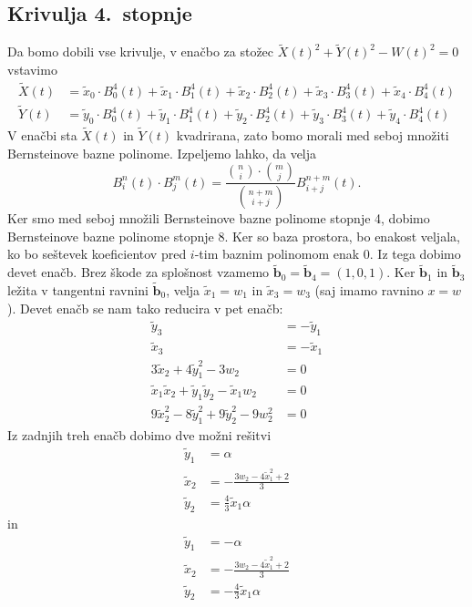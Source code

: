 \documentclass[a4paper,11pt]{article}
\theoremstyle{definition}
\theoremstyle{plain}
\begin{document}

\subsection{Krivulja 4.~stopnje}
Da bomo dobili vse krivulje, v enačbo za stožec $\tilde{X}(t)^2+\tilde{Y}(t)^2-W(t)^2=0$ vstavimo 
\begin{align*}
\tilde{X}(t) &= \tilde{x}_0\cdot B_0^4(t)+\tilde{x}_1\cdot B_1^4(t)+ \tilde{x}_2\cdot B_2^4(t) + \tilde{x}_3\cdot B_3^4(t) +\tilde{x}_4\cdot B_4^4(t)   \\
\tilde{Y}(t) &=\tilde{y}_0\cdot B_0^4(t)+\tilde{y}_1\cdot B_1^4(t)+\tilde{y}_2\cdot B_2^4(t) + \tilde{y}_3\cdot B_3^4(t) + \tilde{y}_4\cdot B_4^4(t)   
\end{align*}
V enačbi sta $\tilde{X}(t)$ in $\tilde{Y}(t)$ kvadrirana, zato bomo morali med seboj množiti Bernsteinove bazne polinome. Izpeljemo lahko, da velja
$$B_i^n(t)\cdot B_j^m(t)=\frac{\binom{n}{i} \cdot \binom{m}{j}}{\binom{n+m}{i+j}}B_{i+j}^{n+m}(t).$$
Ker smo med seboj množili Bernsteinove bazne polinome stopnje 4, dobimo Bernsteinove bazne polinome stopnje 8. Ker so baza prostora, bo enakost veljala, ko bo seštevek koeficientov pred $i$-tim baznim polinomom enak 0. Iz tega dobimo devet enačb.
Brez škode za splošnost vzamemo $\boldsymbol{\tilde{b}}_0 =\boldsymbol{\tilde{b}}_4 = (1,0,1)$. Ker $\boldsymbol{\tilde{b}}_1$ in $\boldsymbol{\tilde{b}}_3$ ležita v tangentni ravnini $\boldsymbol{\tilde{b}}_0$, velja $\tilde{x}_1=w_1$ in $\tilde{x}_3=w_3$ (saj imamo ravnino $x=w$). Devet enačb se nam tako reducira v pet enačb:
\begin{align*}
\tilde{y}_3 &=- \tilde{y}_1 \\
\tilde{x}_3 &= - \tilde{x}_1 \\
3\tilde{x}_2 + 4\tilde{y}_1^2 - 3w_2 &= 0 \\
\tilde{x}_1\tilde{x}_2 + \tilde{y}_1\tilde{y}_2  - \tilde{x}_1w_2 &= 0 \\
9\tilde{x}_2^2 - 8\tilde{y}_1^2 + 9\tilde{y}_2^2 - 9w_2^2&= 0 
\end{align*}
Iz zadnjih treh enačb dobimo dve možni rešitvi
\begin{align*}
\tilde{y}_1 &= \alpha \\
\tilde{x}_2 &=-\frac{3w_2-4\tilde{x}_1^2+2}{3}\\
\tilde{y}_2 &= \frac{4}{3}\tilde{x}_1\alpha
\end{align*}
in
\begin{align*}
\tilde{y}_1 &= -\alpha \\
\tilde{x}_2 &=-\frac{3w_2-4\tilde{x}_1^2+2}{3}\\
\tilde{y}_2 &= -\frac{4}{3}\tilde{x}_1\alpha
\end{align*}
\end{document}
